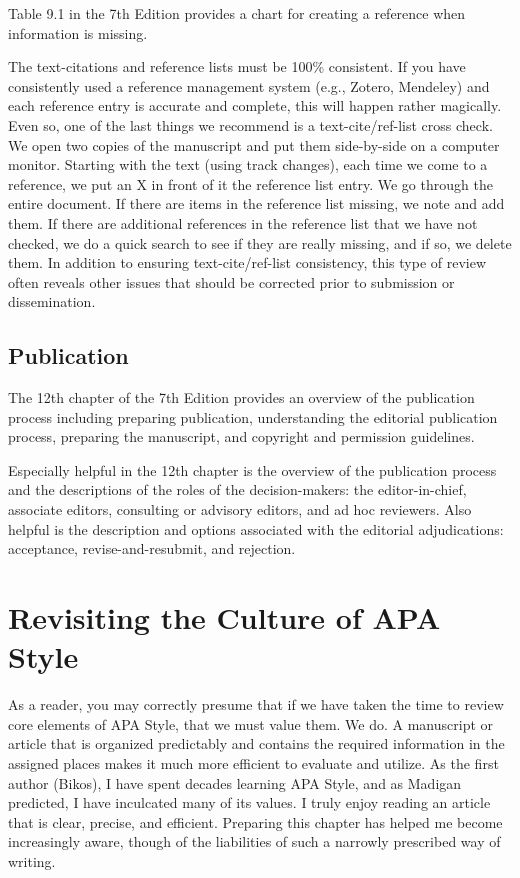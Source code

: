 \documentclass[
  11pt,
]{book}
\begin{document}
Table 9.1 in the 7th Edition provides a chart for creating a reference when information is missing.

The text-citations and reference lists must be 100\% consistent. If you have consistently used a reference management system (e.g., Zotero, Mendeley) and each reference entry is accurate and complete, this will happen rather magically. Even so, one of the last things we recommend is a text-cite/ref-list cross check. We open two copies of the manuscript and put them side-by-side on a computer monitor. Starting with the text (using track changes), each time we come to a reference, we put an X in front of it the reference list entry. We go through the entire document. If there are items in the reference list missing, we note and add them. If there are additional references in the reference list that we have not checked, we do a quick search to see if they are really missing, and if so, we delete them. In addition to ensuring text-cite/ref-list consistency, this type of review often reveals other issues that should be corrected prior to submission or dissemination.

\subsection{Publication}\label{publication}

The 12th chapter of the 7th Edition provides an overview of the publication process including preparing publication, understanding the editorial publication process, preparing the manuscript, and copyright and permission guidelines.

Especially helpful in the 12th chapter is the overview of the publication process and the descriptions of the roles of the decision-makers: the editor-in-chief, associate editors, consulting or advisory editors, and ad hoc reviewers. Also helpful is the description and options associated with the editorial adjudications: acceptance, revise-and-resubmit, and rejection.

\section{Revisiting the Culture of APA Style}\label{revisiting-the-culture-of-apa-style}

As a reader, you may correctly presume that if we have taken the time to review core elements of APA Style, that we must value them. We do. A manuscript or article that is organized predictably and contains the required information in the assigned places makes it much more efficient to evaluate and utilize. As the first author (Bikos), I have spent decades learning APA Style, and as Madigan \citeyearpar{madigan_language_1995} predicted, I have inculcated many of its values. I truly enjoy reading an article that is clear, precise, and efficient. Preparing this chapter has helped me become increasingly aware, though of the liabilities of such a narrowly prescribed way of writing.
\end{document}
